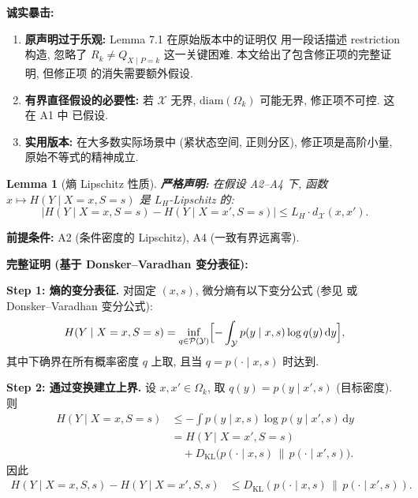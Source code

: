 \documentclass[12pt,a4paper]{article}
\newtheorem{lemma}[theorem]{Lemma}
\newcommand{\cX}{\mathcal{X}}
\newcommand{\cY}{\mathcal{Y}}
\newcommand{\diam}{\mathrm{diam}}
\newcommand{\KL}{D_{\mathrm{KL}}}
\newcommand{\premise}{\textbf{前提条件: }}
\newcommand{\critique}{\medskip\noindent\textbf{诚实暴击: }}
\begin{document}
\bigskip
\critique
\begin{enumerate}
    \item \textbf{原声明过于乐观:} Lemma 7.1 在原始版本中的证明仅
          用一段话描述 restriction 构造, 忽略了 $R_k\neq Q_{X\mid P=k}$
          这一关键困难. 本文给出了包含修正项的完整证明, 但修正项
          的消失需要额外假设.
    \item \textbf{有界直径假设的必要性:} 若 $\cX$ 无界,
          $\diam(\Omega_k)$ 可能无界, 修正项不可控. 这在 A1 中
          已假设.
    \item \textbf{实用版本:} 在大多数实际场景中 (紧状态空间,
          正则分区), 修正项是高阶小量, 原始不等式的精神成立.
\end{enumerate}


\begin{lemma}[熵 Lipschitz 性质]\label{lem:entropy-lip}
\textbf{严格声明:}
在假设 A2--A4 下, 函数 $x\mapsto H(Y\mid X=x,S=s)$ 是
$L_H$-Lipschitz 的:
\begin{equation}\label{eq:entropy-lip}
    |H(Y\mid X=x,S=s) - H(Y\mid X=x',S=s)|
    \leq L_H\cdot d_{\cX}(x,x').
\end{equation}
\end{lemma}

\premise A2 (条件密度的 Lipschitz), A4 (一致有界远离零).

\medskip\noindent
\textbf{完整证明 (基于 Donsker--Varadhan 变分表征):}

\textbf{Step 1: 熵的变分表征.}
对固定 $(x,s)$, 微分熵有以下变分公式
(参见 \citet{cover1999elements} 或 Donsker--Varadhan 变分公式):
\begin{equation}\label{eq:dv}
    H(Y\mid X=x,S=s) = \inf_{q\in\mathcal{P}(\cY)}
    \Bigl[-\int_{\cY} p(y\mid x,s)\log q(y)\,\mathrm{d}y\Bigr],
\end{equation}
其中下确界在所有概率密度 $q$ 上取, 且当 $q=p(\cdot\mid x,s)$
时达到.

\textbf{Step 2: 通过变换建立上界.}
设 $x,x'\in\Omega_k$, 取 $q(y) = p(y\mid x',s)$ (目标密度).
则
\begin{align*}
    H(Y\mid X=x,S=s)
    &\leq -\int p(y\mid x,s)\log p(y\mid x',s)\,\mathrm{d}y \\
    &= H(Y\mid X=x',S=s) \\
    &\quad + \KL\!\bigl(p(\cdot\mid x,s)\,\|\,p(\cdot\mid x',s)\bigr).
\end{align*}
因此
\begin{align*}
    H(Y\mid X=x,S,s) - H(Y\mid X=x',S,s)
    &\leq \KL(p(\cdot\mid x,s)\,\|\,p(\cdot\mid x',s)).
\end{align*}
\end{document}
